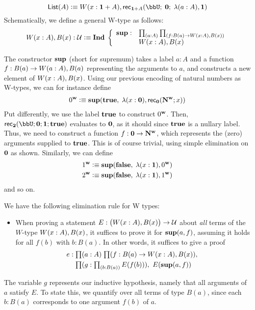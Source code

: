 \[ \lst A \defeq \wtype{x:\disj{\one}{A}} \rec{\disj{\one}{A}}(\bbU; \; \zero; \; \lambda{(a:A)}, \one) \]
Schematically, we define a general W-type as follows:
\[ \wtype{x:A} B(x) : \type \defeq \myInd \left\{
\begin{array}{ll}
\supp : & \prd{a:A}{f : B(a) \to \wtype{x:A} B(x)} \\ & \wtype{x:A} B(x)
\end{array}
\right. \]

The constructor $\mathbf{sup}$ (short for supremum) takes a label $a : A$ and a function $f : B(a) \to W(a:A), B(a)$ representing the arguments to $a$, and constructs a new element of $W(x:A), B(x)$. Using our previous encoding of natural numbers as W-types, we can for instance define
\begin{align*}
0^\mathbf{w} \vcentcolon\equiv \mathbf{sup}(\mathbf{true}, \; \lambda(x : \mathbf{0}), \mathsf{rec}_{\mathbf{0}}(\mathbf{N^w};x))
\end{align*}
Put differently, we use the label $\mathbf{true}$ to construct $0^\mathbf{w}$. Then, $\rec\two(\bbU;\zero;\one; \true)$ evaluates to $\mathbf{0}$, as it should since $\mathbf{true}$ is a nullary label. Thus, we need to construct a function $f : \mathbf{0} \to \mathbf{N^w}$, which represents the (zero) arguments supplied to $\mathbf{true}$. This is of course trivial, using simple elimination on $\mathbf{0}$ as shown. Similarly, we can define
\begin{align*}
1^\mathbf{w} \vcentcolon\equiv \mathbf{sup}(\mathbf{false}, \; \lambda(x : \mathbf{1}), 0^\mathbf{w}) \\
2^\mathbf{w} \vcentcolon\equiv \mathbf{sup}(\mathbf{false}, \; \lambda(x : \mathbf{1}), 1^\mathbf{w})
\end{align*}
and so on.

We have the following elimination rule for W types:
\begin{itemize}
\item When proving a statement $E : \big(W(x:A), B(x)\big) \to \mathcal{U}$ about \emph{all} terms of the $W$-type $W(x:A), B(x)$, it suffices to prove it for $\mathbf{sup}(a,f)$, assuming it holds for all $f(b)$ with $b : B(a)$. 
In other words, it suffices to give a proof 
\begin{align*}
e : & \; \prd{a:A}{f : B(a) \to \wtype{x:A} B(x)}\\ & \; \prd{g : \prd{b : B(a)} E(f(b))} E(\supp(a,f))
\end{align*}
\end{itemize}

The variable $g$ represents our inductive hypothesis, namely that all arguments of $a$ satisfy $E$. To state this, we quantify over all terms of type $B(a)$, since each $b : B(a)$ corresponds to one argument $f(b)$ of $a$.

